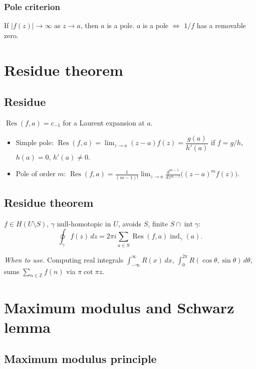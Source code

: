 \subsubsection{Pole criterion}
\label{subsubsec:pole-criterion}

If $|f(z)|\to\infty$ as $z\to a$, then $a$ is a pole. $a$ is a pole $\iff$ $1/f$ has a removable zero.

\medskip

\section{Residue theorem}
\label{sec:residue-theorem}

\subsection{Residue}
\label{subsec:residue}

$\operatorname{Res}(f,a)=c_{-1}$ for a Laurent expansion at $a$.
\begin{itemize}
\item Simple pole: $\operatorname{Res}(f,a)=\lim_{z\to a}(z-a)f(z)=\dfrac{g(a)}{h'(a)}$ if $f=g/h$, $h(a)=0$, $h'(a)\neq0$.
\item Pole of order $m$: $\operatorname{Res}(f,a)=\frac1{(m-1)!}\lim_{z\to a}\frac{d^{m-1}}{dz^{m-1}}\bigl((z-a)^m f(z)\bigr)$.
\end{itemize}

\subsection{Residue theorem}
\label{subsec:residue-theorem}

$f\in H(U\setminus S)$, $\gamma$ null-homotopic in $U$, avoids $S$, finite $S\cap\operatorname{int}\gamma$:
$$\oint_\gamma f(z)\,dz=2\pi i\sum_{a\in S}\operatorname{Res}(f,a)\operatorname{ind}_\gamma(a).$$

\textit{When to use.} Computing real integrals $\int_{-\infty}^\infty R(x)\,dx$, $\int_0^{2\pi} R(\cos\theta,\sin\theta)\,d\theta$, sums $\sum_{n\in\mathbb{Z}} f(n)$ via $\pi\cot\pi z$.

\medskip

\section{Maximum modulus and Schwarz lemma}
\label{sec:maximum-modulus}

\subsection{Maximum modulus principle}
\label{subsec:maximum-modulus}

